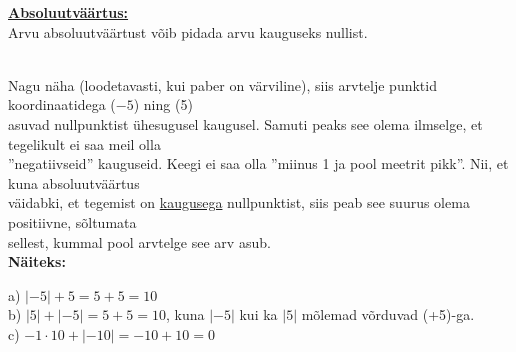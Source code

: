 \begin{center}
{{{\begin{flushleft}
\vspace{5mm}
\hspace{5mm} \textbf{\underline{Absoluutväärtus:}}\\
\vspace{5mm}
\hspace{5mm} Arvu absoluutväärtust võib pidada arvu kauguseks nullist.\\
\vspace{5mm}
\hspace{5mm} \\
\vspace{2mm}
\hspace{5mm} Nagu näha (loodetavasti, kui paber on värviline), siis arvtelje punktid koordinaatidega ($-5$) ning (5)\\ \hspace{5mm} asuvad nullpunktist ühesugusel kaugusel. Samuti peaks see olema ilmselge, et tegelikult ei saa meil olla\\ \hspace{5mm}  ''negatiivseid'' kauguseid. Keegi ei saa olla ''miinus 1 ja pool meetrit pikk''. Nii, et kuna absoluutväärtus\\ \hspace{5mm} väidabki, et tegemist on \underline{kaugusega} nullpunktist, siis peab see suurus olema positiivne, sõltumata\\ \hspace{5mm} sellest, kummal pool arvtelge see arv asub.\\
\vspace{5mm}
\hspace{5mm} \textbf{Näiteks:}
\vspace{5mm}

\hspace{5mm} a) $|-5| + 5 = 5 + 5 = 10$\\
\vspace{2mm}
\hspace{5mm} b) $|5| + |-5| = 5 + 5 = 10$,\hspace{1cm}  kuna $|-5|$ kui ka $|5|$ mõlemad võrduvad (+5)-ga.\\
\vspace{2mm}
\hspace{5mm} c) $-1\cdot 10 + |-10| = -10 + 10 = 0$\\
\vspace{5mm}
\end{flushleft} }}}
\end{center}

